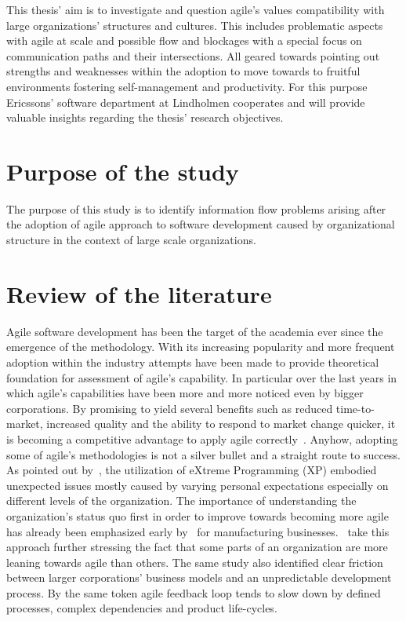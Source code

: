 \documentclass[paper=a4, fontsize=11pt]{scrartcl}
\numberwithin{equation}{section}		%
\numberwithin{figure}{section}			%
\numberwithin{table}{section}			%
\begin{document}
This thesis' aim is to investigate and question agile's values compatibility with large organizations' structures and cultures. This includes problematic aspects with agile at scale and possible flow and blockages with a special focus on communication paths and their intersections. All geared towards pointing out strengths and weaknesses within the adoption to move towards to fruitful environments fostering self-management and productivity. For this purpose Ericssons' software department at Lindholmen cooperates and will provide valuable insights regarding the thesis' research objectives.

\section{Purpose of the study}

The purpose of this study is to identify information flow problems arising after the adoption of agile approach to software development caused by organizational structure in the context of large scale organizations.

\section{Review of the literature}

Agile software development has been the target of the academia ever since the emergence of the methodology. With its increasing popularity and more frequent adoption within the industry attempts have been made to provide theoretical foundation for assessment of agile's capability. In particular over the last years in which agile's capabilities have been more and more noticed even by bigger corporations. By promising to yield several benefits such as reduced time-to-market, increased quality and the ability to respond to market change quicker, it is becoming a competitive advantage to apply agile correctly~\citep{schwaber2007agile}. Anyhow, adopting some of agile's methodologies is not a silver bullet and a straight route to success. As pointed out by~\citet{grenning2001xp}, the utilization of eXtreme Programming (XP) embodied unexpected issues mostly caused by varying personal expectations especially on different levels of the organization. The importance of understanding the organization's status quo first in order to improve towards becoming more agile has already been emphasized early by~\citet{zhang1999manufacturing} for manufacturing businesses.~\citet{kettunen2008agileorg} take this approach further stressing the fact that some parts of an organization are more leaning towards agile than others. The same study also identified clear friction between larger corporations' business models and an unpredictable development process. By the same token agile feedback loop tends to slow down by defined processes, complex dependencies and product life-cycles.
\end{document}
